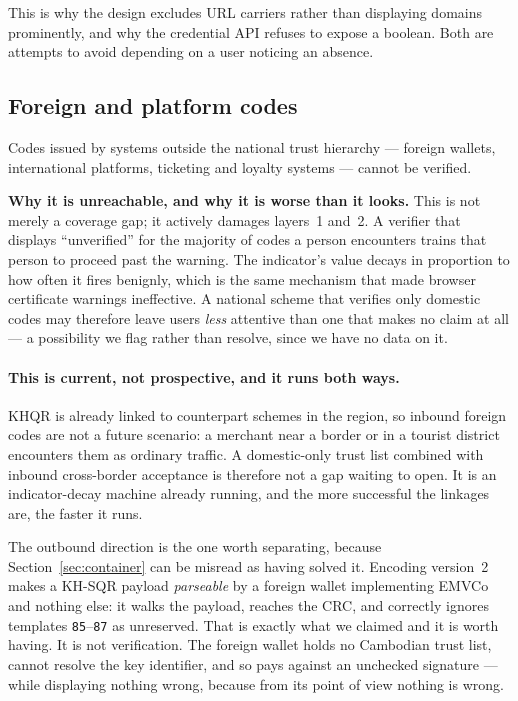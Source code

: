 \documentclass[10pt,a4paper,twocolumn]{article}
\newcommand{\code}[1]{\texttt{\small #1}}
\begin{document}
This is why the design excludes URL carriers rather than displaying domains
prominently, and why the credential API refuses to expose a boolean. Both are
attempts to avoid depending on a user noticing an absence.

\subsection{Foreign and platform codes}
\label{sec:foreign}

Codes issued by systems outside the national trust hierarchy --- foreign wallets,
international platforms, ticketing and loyalty systems --- cannot be verified.

\textbf{Why it is unreachable, and why it is worse than it looks.} This is not
merely a coverage gap; it actively damages layers~1 and~2. A verifier that
displays ``unverified'' for the majority of codes a person encounters trains
that person to proceed past the warning. The indicator's value decays in
proportion to how often it fires benignly, which is the same mechanism that made
browser certificate warnings ineffective. A national scheme that verifies only
domestic codes may therefore leave users \emph{less} attentive than one that
makes no claim at all --- a possibility we flag rather than resolve, since we have
no data on it.

\paragraph{This is current, not prospective, and it runs both ways.} KHQR is
already linked to counterpart schemes in the region, so inbound foreign codes
are not a future scenario: a merchant near a border or in a tourist district
encounters them as ordinary traffic. A domestic-only trust list combined with
inbound cross-border acceptance is therefore not a gap waiting to open. It is an
indicator-decay machine already running, and the more successful the linkages
are, the faster it runs.

The outbound direction is the one worth separating, because
Section~\ref{sec:container} can be misread as having solved it. Encoding
version~2 makes a KH-SQR payload \emph{parseable} by a foreign wallet
implementing EMVCo and nothing else: it walks the payload, reaches the CRC, and
correctly ignores templates \code{85}--\code{87} as unreserved. That is exactly
what we claimed and it is worth having. It is not verification. The foreign
wallet holds no Cambodian trust list, cannot resolve the key identifier, and so
pays against an unchecked signature --- while displaying nothing wrong, because
from its point of view nothing is wrong.
\end{document}
